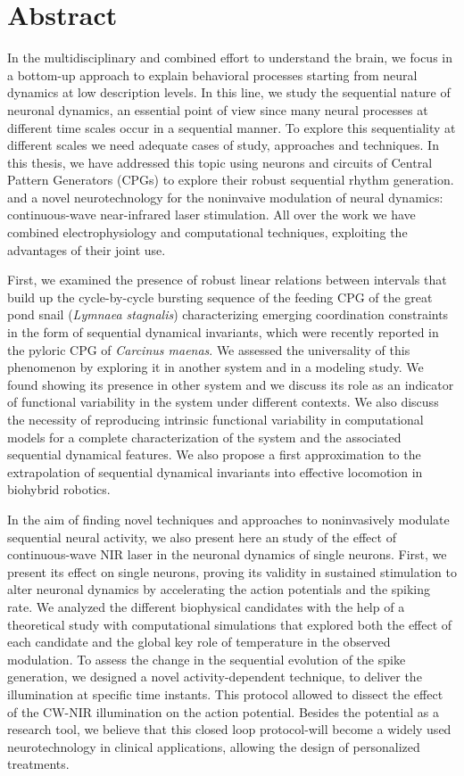\chapter*{Abstract}
In the multidisciplinary and combined effort to understand the brain, we focus in a bottom-up approach to explain behavioral processes starting from neural dynamics at low description 
 levels. In this line, we study the sequential nature of neuronal dynamics, an essential point of view since many neural processes at different time scales occur in a sequential manner. To explore this sequentiality at different scales we need adequate cases of study, approaches and techniques. In this thesis, we have addressed this topic using neurons and circuits of Central Pattern Generators (CPGs) to explore their robust sequential rhythm generation. and a novel neurotechnology for the noninvaive modulation of neural dynamics: continuous-wave near-infrared laser stimulation. All over the work we have combined electrophysiology and computational techniques, exploiting the advantages of their joint use. 

First, we examined the presence of robust linear relations between intervals that build up the cycle-by-cycle bursting sequence of the feeding CPG of the great pond snail (\textit{Lymnaea stagnalis}) characterizing emerging coordination constraints in the form of sequential dynamical invariants, which were recently reported in the pyloric CPG of \textit{Carcinus maenas}. We assessed the universality of this phenomenon by exploring it in another system and in a modeling study. We found showing its presence in other system and we discuss its role as an indicator of functional variability in the system under different contexts. We also discuss the necessity of reproducing intrinsic functional variability in computational models for a complete characterization of the system and the associated sequential dynamical features. We also propose a first approximation to the extrapolation of sequential dynamical invariants into effective locomotion in biohybrid robotics. 

In the aim of finding novel techniques and approaches to noninvasively modulate sequential neural activity, we also present here an study of the effect of continuous-wave NIR laser in the neuronal dynamics of single neurons. First, we present its effect on single neurons, proving its validity in sustained stimulation to alter neuronal dynamics by accelerating the action potentials and the spiking rate. We analyzed the different biophysical candidates with the help of a theoretical study with computational simulations that explored both the effect of each candidate and the global key role of temperature in the observed modulation. To assess the change in the sequential evolution of the spike generation,  we designed a novel activity-dependent technique, to deliver the illumination at specific time instants. This protocol allowed to dissect the effect of the CW-NIR illumination on the action potential. Besides the potential as a research tool, we believe that this closed loop protocol-will become a widely used neurotechnology in clinical applications, allowing the design of personalized treatments. 

